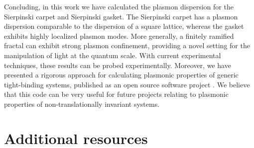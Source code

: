 Concluding, in this work we have calculated the plasmon dispersion for the Sierpinski carpet and Sierpinski gasket. The Sierpinski carpet has a plasmon dispersion comparable to the dispersion of a square lattice, whereas the gasket exhibits highly localized plasmon modes. More generally, a finitely ramified fractal can exhibit strong plasmon confinement, providing a novel setting for the manipulation of light at the quantum scale. With current experimental techniques, these results can be probed experimentally. Moreover, we have presented a rigorous approach for calculating plasmonic properties of generic tight-binding systems, published as an open source software project \cite{Westerhout2017}. We believe that this code can be very useful for future projects relating to plasmonic properties of non-translationally invariant systems.

\section{Additional resources}


